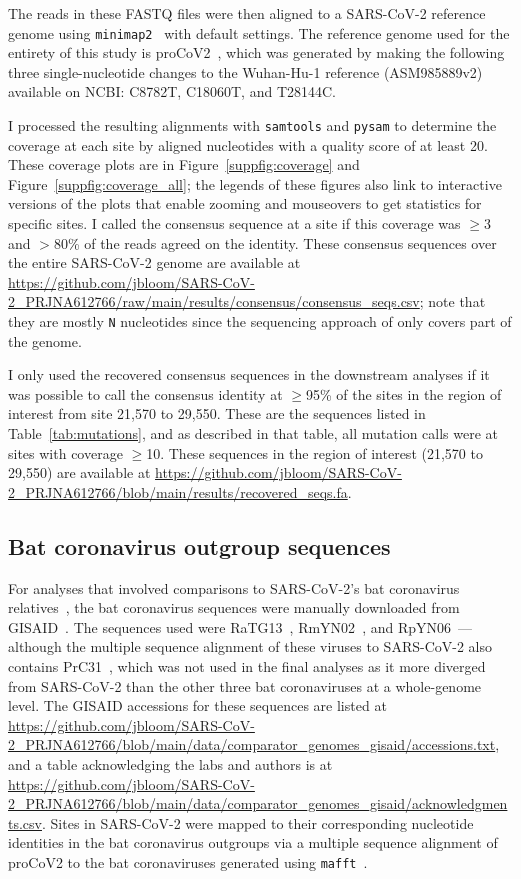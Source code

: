 \documentclass[9pt,twocolumn,twoside]{gsajnl_modified}
\begin{document}
{The reads in these FASTQ files were then aligned to a SARS-CoV-2 reference genome using \texttt{minimap2}~\citep{li2018minimap2} with default settings.
The reference genome used for the entirety of this study is proCoV2~\citep{kumar2021evolutionary}, which was generated by making the following three single-nucleotide changes to the Wuhan-Hu-1 reference (ASM985889v2) available on NCBI: C8782T, C18060T, and T28144C.

I processed the resulting alignments with \texttt{samtools} and \texttt{pysam} to determine the coverage at each site by aligned nucleotides with a quality score of at least 20.
These coverage plots are in Figure~\ref{suppfig:coverage} and Figure~\ref{suppfig:coverage_all}; the legends of these figures also link to interactive versions of the plots that enable zooming and mouseovers to get statistics for specific sites.
I called the consensus sequence at a site if this coverage was $\ge$3 and $>$80\% of the reads agreed on the identity.
These consensus sequences over the entire SARS-CoV-2 genome are available at \url{https://github.com/jbloom/SARS-CoV-2_PRJNA612766/raw/main/results/consensus/consensus_seqs.csv}; note that they are mostly \texttt{N} nucleotides since the sequencing approach of \citet{wang2020medRxiv} only covers part of the genome.

I only used the recovered consensus sequences in the downstream analyses if it was possible to call the consensus identity at $\ge$95\% of the sites in the region of interest from site 21,570 to 29,550.
These are the sequences listed in Table~\ref{tab:mutations}, and as described in that table, all mutation calls were at sites with coverage $\ge$10.
These sequences in the region of interest (21,570 to 29,550) are available at \url{https://github.com/jbloom/SARS-CoV-2_PRJNA612766/blob/main/results/recovered_seqs.fa}.

\subsection{Bat coronavirus outgroup sequences}
For analyses that involved comparisons to SARS-CoV-2's bat coronavirus relatives~\citep{lytras2021exploring}, the bat coronavirus sequences were manually downloaded from GISAID~\citep{shu2017gisaid}.
The sequences used were RaTG13~\citep{zhou2020pneumonia}, RmYN02~\citep{zhou2020novel}, and RpYN06~\citep{zhou2021identification}---although the multiple sequence alignment of these viruses to SARS-CoV-2 also contains PrC31~\citep{li2021novel}, which was not used in the final analyses as it more diverged from SARS-CoV-2 than the other three bat coronaviruses at a whole-genome level.
The GISAID accessions for these sequences are listed at \url{https://github.com/jbloom/SARS-CoV-2_PRJNA612766/blob/main/data/comparator_genomes_gisaid/accessions.txt}, and a table acknowledging the labs and authors is at \url{https://github.com/jbloom/SARS-CoV-2_PRJNA612766/blob/main/data/comparator_genomes_gisaid/acknowledgments.csv}.
Sites in SARS-CoV-2 were mapped to their corresponding nucleotide identities in the bat coronavirus outgroups via a multiple sequence alignment of proCoV2 to the bat coronaviruses generated using \texttt{mafft}~\citep{katoh2013mafft}.

}
\end{document}
